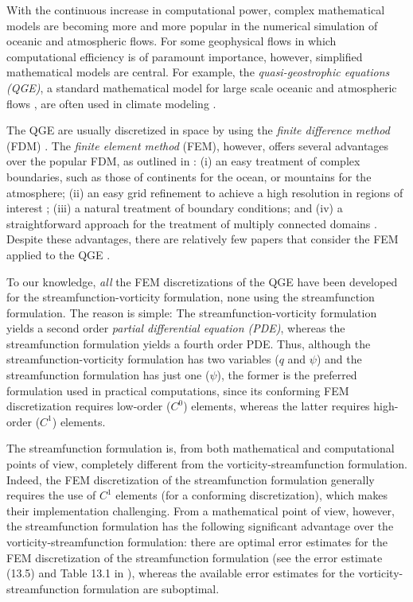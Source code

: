 With the continuous increase in computational power, complex mathematical models
are becoming more and more popular in the numerical simulation of oceanic and
atmospheric flows. For some geophysical flows in which computational efficiency
is of paramount importance, however, simplified mathematical models are central.
For example, the \emph{quasi-geostrophic equations (QGE)}, a standard
mathematical model for large scale oceanic and atmospheric flows
\cite{Cushman11,Majda,Pedlosky92,Vallis06}, are often used in climate modeling
\cite{Dijkstra05}.

The QGE are usually discretized in space by using the \emph{finite difference
method} (FDM) \cite{San11}. The \emph{finite element method} (FEM), however,
offers several advantages over the popular FDM, as outlined in \cite{Myers}: (i)
an easy treatment of complex boundaries, such as those of continents for the
ocean, or mountains for the atmosphere; (ii) an easy grid refinement to achieve
a high resolution in regions of interest \cite{Cascon}; (iii) a natural
treatment of boundary conditions; and (iv) a straightforward approach for the
treatment of multiply connected domains \cite{Myers}. Despite these advantages,
there are relatively few papers that consider the FEM applied to the QGE
\cite{Cascon, Fix, LeProvost94, Myers, Stevens82}.

To our knowledge, \emph{all} the FEM discretizations of the QGE have been
developed for the streamfunction-vorticity formulation, none using the
streamfunction formulation. The reason is simple: The streamfunction-vorticity
formulation yields a second order \emph{partial differential equation (PDE)},
whereas the streamfunction formulation yields a fourth order PDE. Thus, although
the streamfunction-vorticity formulation has two variables ($q$ and $\psi$) and
the streamfunction formulation has just one ($\psi$), the former is the
preferred formulation used in practical computations, since its conforming FEM
discretization requires low-order ($C^0$) elements, whereas the latter requires
high-order ($C^1$) elements.

The streamfunction formulation is, from both mathematical and computational
points of view, completely different from the vorticity-streamfunction
formulation. Indeed, the FEM discretization of the streamfunction formulation
generally requires the use of $C^1$ elements (for a conforming discretization),
which makes their implementation challenging. From a mathematical point of view,
however, the streamfunction formulation has the following significant advantage
over the vorticity-streamfunction formulation: there are optimal error estimates
for the FEM discretization of the streamfunction formulation (see the error
estimate (13.5) and Table 13.1 in \cite{Gunzburger89}), whereas the available
error estimates for the vorticity-streamfunction formulation are suboptimal.

